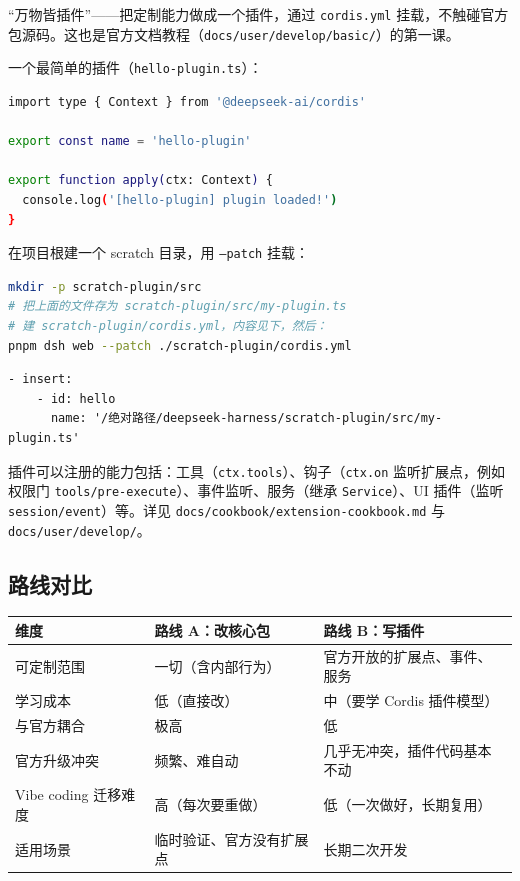 \documentclass[11pt]{ctexart}
\newcommand{\code}[1]{\texttt{\small #1}}
\begin{document}
“万物皆插件”——把定制能力做成一个插件，通过 \code{cordis.yml} 挂载，不触碰官方包源码。这也是官方文档教程（\code{docs/user/develop/basic/}）的第一课。

一个最简单的插件（\code{hello-plugin.ts}）：

\begin{lstlisting}[language=bash]
import type { Context } from '@deepseek-ai/cordis'

export const name = 'hello-plugin'

export function apply(ctx: Context) {
  console.log('[hello-plugin] plugin loaded!')
}
\end{lstlisting}

在项目根建一个 scratch 目录，用 \code{--patch} 挂载：

\begin{lstlisting}[language=bash]
mkdir -p scratch-plugin/src
# 把上面的文件存为 scratch-plugin/src/my-plugin.ts
# 建 scratch-plugin/cordis.yml，内容见下，然后：
pnpm dsh web --patch ./scratch-plugin/cordis.yml
\end{lstlisting}

\begin{lstlisting}
- insert:
    - id: hello
      name: '/绝对路径/deepseek-harness/scratch-plugin/src/my-plugin.ts'
\end{lstlisting}

\noindent 插件可以注册的能力包括：工具（\code{ctx.tools}）、钩子（\code{ctx.on} 监听扩展点，例如权限门 \code{tools/pre-execute}）、事件监听、服务（继承 \code{Service}）、UI 插件（监听 \code{session/event}）等。详见 \code{docs/cookbook/extension-cookbook.md} 与 \code{docs/user/develop/}。

\subsection{路线对比}

\begin{table}[htbp]
\centering
\begin{tabular}{@{}p{4.2cm}p{6cm}p{6cm}@{}}
\toprule
维度 & 路线 A：改核心包 & 路线 B：写插件 \\
\midrule
可定制范围 & 一切（含内部行为） & 官方开放的扩展点、事件、服务 \\
学习成本 & 低（直接改） & 中（要学 Cordis 插件模型） \\
与官方耦合 & 极高 & 低 \\
官方升级冲突 & 频繁、难自动 & 几乎无冲突，插件代码基本不动 \\
Vibe coding 迁移难度 & 高（每次要重做） & 低（一次做好，长期复用） \\
适用场景 & 临时验证、官方没有扩展点 & 长期二次开发 \\
\bottomrule
\end{tabular}
\end{table}
\end{document}

